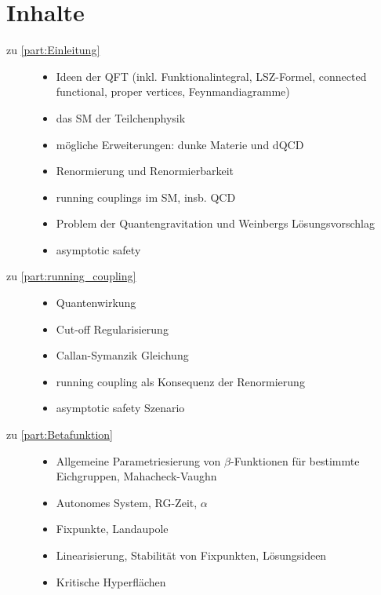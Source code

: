 \section{Inhalte}
	\begin{description}
	
		\item[zu \ref{part:Einleitung}]
			\begin{itemize}
				\item	Ideen der QFT (inkl. Funktionalintegral, 
						LSZ-Formel, connected functional, proper 
						vertices, Feynmandiagramme)
				\item	das SM der Teilchenphysik
				\item	mögliche Erweiterungen: dunke Materie und 
						dQCD
				\item	Renormierung und Renormierbarkeit
				\item	running couplings im SM, insb. QCD
				\item 	Problem der Quantengravitation und Weinbergs 
						Lösungsvorschlag
				\item	asymptotic safety
			\end{itemize}
			
		\item[zu \ref{part:running_coupling}]
			\begin{itemize}
				\item	Quantenwirkung
				\item	Cut-off Regularisierung
				\item	Callan-Symanzik Gleichung
				\item 	running coupling als Konsequenz der 
						Renormierung
				\item	asymptotic safety Szenario
			\end{itemize}
			
		\item[zu \ref{part:Betafunktion}]
			\begin{itemize}
				\item	Allgemeine Parametriesierung von 
						$\beta$-Funktionen für bestimmte 
						Eichgruppen, Mahacheck-Vaughn
				\item 	Autonomes System, RG-Zeit, $\alpha$
				\item	Fixpunkte, Landaupole
				\item 	Linearisierung, Stabilität von Fixpunkten, 
						Lösungsideen
				\item 	Kritische Hyperflächen
			\end{itemize}
			

\end{description}
